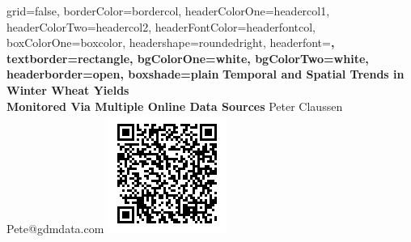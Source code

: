 \documentclass[paperwidth=42in,paperheight=44in,fontscale=0.31]{baposter}
\begin{document}

\begin{poster}{
grid=false,
borderColor=bordercol, %
headerColorOne=headercol1, %
headerColorTwo=headercol2, %
headerFontColor=headerfontcol, %
boxColorOne=boxcolor, %
headershape=roundedright, %
headerfont=\Large\sf\bf, %
textborder=rectangle,
bgColorOne=white, %
bgColorTwo=white, %
headerborder=open, %
boxshade=plain
}
{}
%
%
{\sf\bf Temporal and Spatial Trends in Winter Wheat Yields  \\ Monitored Via Multiple Online Data Sources } %
{\vspace{1em} Peter Claussen\\ %
{\smaller Pete@gdmdata.com}} %
{\includegraphics[scale=0.40]{barcodes}} %



\end{poster}
\end{document}
